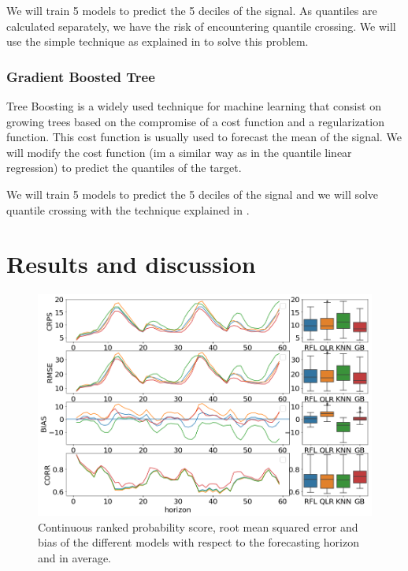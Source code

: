 \documentclass[a4paper,twocolumn,5p]{elsarticle}
\begin{document}
We will train 5 models to predict the 5 deciles of the signal. As quantiles are 
calculated separately, we have the risk of encountering quantile crossing.
We will use the simple technique as explained in \cite{cross} to solve this problem.

\subsubsection{Gradient Boosted Tree}

Tree Boosting \cite{friedman_greedy_2001} is a widely used technique for machine learning 
that consist on growing trees based on the compromise 
of a cost function and a regularization function. This cost function is usually 
used to forecast 
the mean of the signal. We will modify the cost function (im a similar way as in 
the quantile linear regression) to predict the quantiles of the target. 

We will train 5 models to predict the 5 deciles of the signal and we will solve 
 quantile crossing with the technique explained in \cite{cross}. 

\section{Results and discussion}
\label{sec:results}

\begin{figure}
  \centering
  \includegraphics[width=\textwidth]{results/errorGraph}
  \caption{Continuous ranked probability score, root mean squared
    error and bias of the different models with respect to the
    forecasting horizon and in average.}
  \label{figure:errorGraph}
\end{figure}
\end{document}
